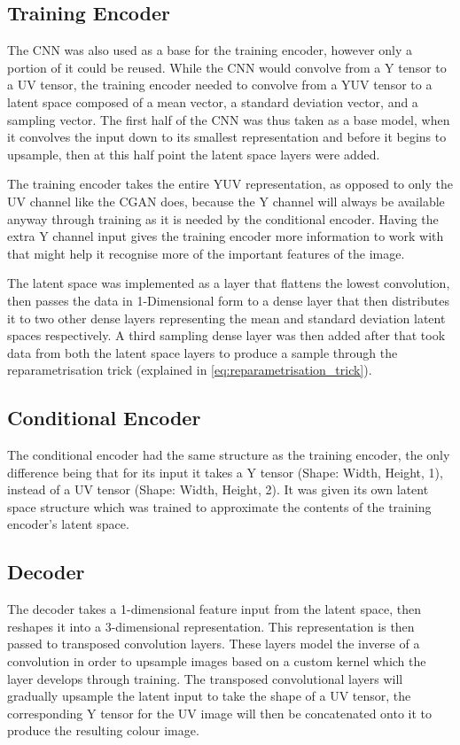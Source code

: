 \documentclass{l4proj}
\begin{document}
\subsection{Training Encoder}
The CNN was also used as a base for the training encoder, however only a portion of it could be reused. While the CNN would convolve from a Y tensor to a UV tensor, the training encoder needed to convolve from a YUV tensor to a latent space composed of a mean vector, a standard deviation vector, and a sampling vector. The first half of the CNN was thus taken as a base model, when it convolves the input down to its smallest representation and before it begins to upsample, then at this half point the latent space layers were added.

The training encoder takes the entire YUV representation, as opposed to only the UV channel like the CGAN does, because the Y channel will always be available anyway through training as it is needed by the conditional encoder. Having the extra Y channel input gives the training encoder more information to work with that might help it recognise more of the important features of the image.

The latent space was implemented as a layer that flattens the lowest convolution, then passes the data in 1-Dimensional form to a dense layer that then distributes it to two other dense layers representing the mean and standard deviation latent spaces respectively. A third sampling dense layer was then added after that took data from both the latent space layers to produce a sample through the reparametrisation trick (explained in \ref{eq:reparametrisation_trick}).

\subsection{Conditional Encoder}
The conditional encoder had the same structure as the training encoder, the only difference being that for its input it takes a Y tensor (Shape: Width, Height, 1), instead of a UV tensor (Shape: Width, Height, 2). It was given its own latent space structure which was trained to approximate the contents of the training encoder's latent space. 

\subsection{Decoder}
The decoder takes a 1-dimensional feature input from the latent space, then reshapes it into a 3-dimensional representation. This representation is then passed to transposed convolution layers. These layers model the inverse of a convolution in order to upsample images based on a custom kernel which the layer develops through training. The transposed convolutional layers will gradually upsample the latent input to take the shape of a UV tensor, the corresponding Y tensor for the UV image will then be concatenated onto it to produce the resulting colour image.
\end{document}
